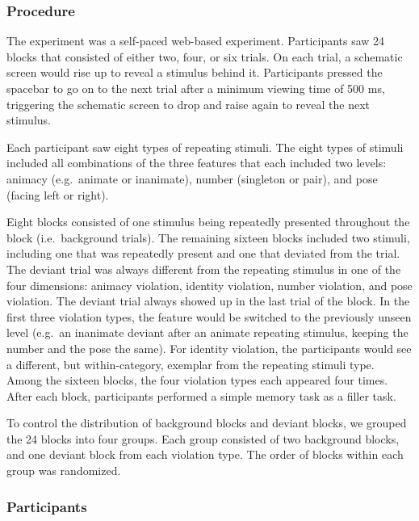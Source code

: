 \documentclass[10pt, letterpaper]{article}
\begin{document}
\hypertarget{procedure}{%
\subsubsection{Procedure}\label{procedure}}

The experiment was a self-paced web-based experiment. Participants saw
24 blocks that consisted of either two, four, or six trials. On each
trial, a schematic screen would rise up to reveal a stimulus behind it.
Participants pressed the spacebar to go on to the next trial after a
minimum viewing time of 500 ms, triggering the schematic screen to drop
and raise again to reveal the next stimulus.

Each participant saw eight types of repeating stimuli. The eight types
of stimuli included all combinations of the three features that each
included two levels: animacy (e.g.~animate or inanimate), number
(singleton or pair), and pose (facing left or right).

Eight blocks consisted of one stimulus being repeatedly presented
throughout the block (i.e.~background trials). The remaining sixteen
blocks included two stimuli, including one that was repeatedly present
and one that deviated from the trial. The deviant trial was always
different from the repeating stimulus in one of the four dimensions:
animacy violation, identity violation, number violation, and pose
violation. The deviant trial always showed up in the last trial of the
block. In the first three violation types, the feature would be switched
to the previously unseen level (e.g.~an inanimate deviant after an
animate repeating stimulus, keeping the number and the pose the same).
For identity violation, the participants would see a different, but
within-category, exemplar from the repeating stimuli type. Among the
sixteen blocks, the four violation types each appeared four times. After
each block, participants performed a simple memory task as a filler
task.

To control the distribution of background blocks and deviant blocks, we
grouped the 24 blocks into four groups. Each group consisted of two
background blocks, and one deviant block from each violation type. The
order of blocks within each group was randomized.

\hypertarget{participants}{%
\subsubsection{Participants}\label{participants}}
\end{document}
